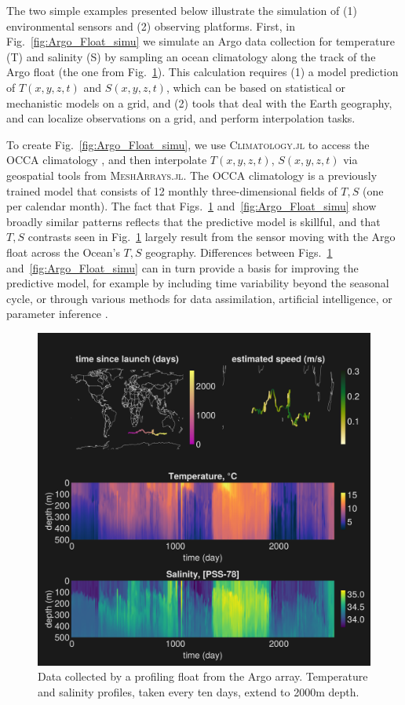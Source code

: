 \documentclass{juliacon}[12pt]
\newcommand{\pkg}[1]{{\small \textsc{#1}}}
\begin{document}
The two simple examples presented below illustrate the simulation of (1) environmental sensors and (2) observing platforms. First, in Fig.~\ref{fig:Argo_Float_simu} we simulate an Argo data collection for temperature (T) and salinity (S) by sampling an ocean climatology along the track of the Argo float (the one from Fig.~\ref{fig:Argo_Float}). This calculation requires (1) a model prediction of $T(x,y,z,t)$ and $S(x,y,z,t)$, which can be based on statistical or mechanistic models on a grid, and (2) tools that deal with the Earth geography, and can localize observations on a grid, and perform interpolation tasks. 

To create Fig.~\ref{fig:Argo_Float_simu}, we use \pkg{Climatology.jl} to access the OCCA climatology \cite{Forget2010}, and then interpolate $T(x,y,z,t)$, $S(x,y,z,t)$ via geospatial tools from \pkg{MeshArrays.jl}. The OCCA climatology is a previously trained model that consists of 12 monthly three-dimensional fields of $T,S$ (one per calendar month). The fact that Figs.~\ref{fig:Argo_Float} and~\ref{fig:Argo_Float_simu} show broadly similar patterns reflects that the predictive model is skillful, and that $T,S$ contrasts seen in Fig.~\ref{fig:Argo_Float} largely result from the sensor moving with the Argo float across the Ocean's $T,S$ geography. Differences between Figs.~\ref{fig:Argo_Float} and~\ref{fig:Argo_Float_simu} can in turn provide a basis for improving the predictive model, for example by including time variability beyond the seasonal cycle, or through various methods for data assimilation, artificial intelligence, or parameter inference \cite{Forget2010,Forget2015a,FFL15,FP15,Forget2024b}.

\begin{figure}[t]
\centerline{\includegraphics[width=\columnwidth]{figs/20240528_Argo_6900900.png}}
\caption{Data collected by a profiling float from the Argo array. Temperature and salinity profiles, taken every ten days, extend to 2000m depth.}
\label{fig:Argo_Float}
\end{figure}
\end{document}
